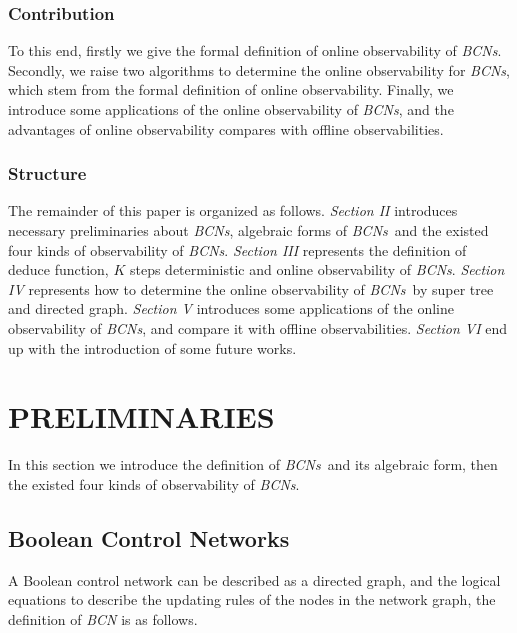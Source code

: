 \documentclass[conference]{IEEEtran} %
\def \BCNs {{\em BCNs}}
\newcommand{\rev}[1]{{\color{red}{#1}}}
\newcommand{\tl}[1]{\textcolor{blue} {TL: #1 :TL} }
\begin{document}
\subsubsection*{Contribution}
To this end, firstly we give the formal definition of online observability of {\em BCNs}. Secondly, we raise two algorithms to determine the online observability for {\em BCNs}, which stem from the formal definition of online observability. Finally, we introduce some applications of the online observability of {\em BCNs}, and the advantages of online observability compares with offline observabilities. %
\subsubsection*{Structure}
The remainder of this paper is organized as follows. {\em Section II} introduces necessary preliminaries about {\em BCNs}, algebraic forms of \BCNs\ and the existed four kinds of observability of {\em BCNs}. {\em Section III} represents the definition of deduce function, $K$ steps deterministic and online observability of {\em BCNs}. {\em Section IV} represents how to determine the online observability of \BCNs\ by super tree and directed graph. {\em Section V} introduces some applications of the online observability of {\em BCNs}, and compare it with offline observabilities. {\em Section VI} end up  with the introduction of some future works.


\section{PRELIMINARIES}
In this section we introduce the definition of \BCNs\ and its algebraic form, then the existed four kinds of observability of {\em BCNs}.



\subsection{Boolean Control Networks}

A Boolean control network can be described as a directed graph, and the logical equations to describe the updating rules of the nodes in the network graph, the definition of {\em BCN} is as follows. 
\end{document}
